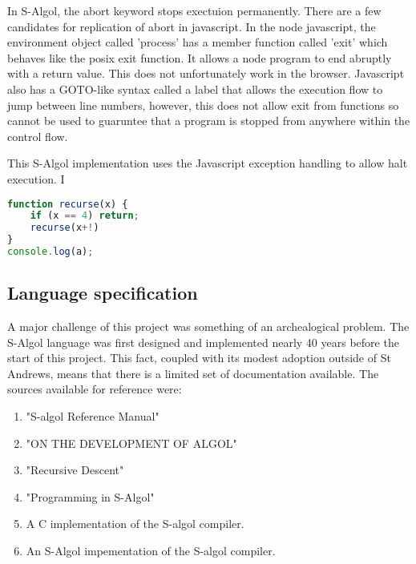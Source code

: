 \documentclass{article}
\begin{document}
In S-Algol, the abort keyword stops exectuion permanently. There are a few candidates for replication of abort in javascript. In the node javascript, the environment object called 'process' has a member function called 'exit' which behaves like the posix exit function. It allows a node program to end abruptly with a return value. This does not unfortunately work in the browser. Javascript also has a GOTO-like syntax called a label that allows the execution flow to jump between line numbers, however, this does not allow exit from functions so cannot be used to guaruntee that a program is stopped from anywhere within the control flow.

This S-Algol implementation uses the Javascript exception handling to allow halt execution. I

\begin{lstlisting}[caption={S-Algol-like Javascript scoping},label={lst:betterscope}, language=javascript, escapechar="|"]
function recurse(x) {
	if (x == 4) return;
	recurse(x+!)
}
console.log(a);
\end{lstlisting}


\subsection{Language specification}

A major challenge of this project was something of an archealogical problem. The S-Algol language was first designed and implemented nearly 40 years before the start of this project. This fact, coupled with its modest adoption outside of St Andrews, means that there is a limited set of documentation available. The sources available for reference were:

\begin{enumerate}
\item "S-algol Reference Manual" \cite{TODO}
\item "ON THE DEVELOPMENT OF ALGOL" \cite{TODO}
\item "Recursive Descent" \cite{TODO}
\item "Programming in S-Algol" \cite{TODO}
\item A C implementation of the S-algol compiler. 
\item An S-Algol impementation of the S-algol compiler. 
\end{enumerate}
\end{document}
